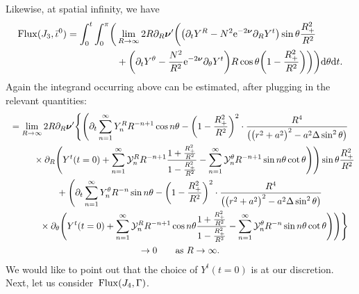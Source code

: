 \documentclass[11pt]{article}
\numberwithin{equation}{section}
\def\ptl{\partial}%
\def\mbo#1{\boldsymbol{#1}}%
\numberwithin{equation}{section}
\begin{document}
Likewise, at spatial infinity, we have
\begin{align*}
{\rm Flux} (J_3, \bar{\iota}^0)= \int^t_0 \int^\pi _0 \biggl(&\lim_{R \to \infty} 2 R \ptl_R \mbo{\nu}' \biggl(\bigl(\ptl_t Y^R - N^2 {\rm e}^{-2 \mbo{\nu}} \ptl_R Y^t\bigr) \sin \theta \frac{R^2_+}{R^2} \notag\\
&{} + \biggl(\ptl_t Y^\theta - \frac{N^2}{R^2} {\rm e}^{-2 \mbo{\nu}} \ptl_\theta Y^t\biggr) R \cos \theta \biggl(1-\frac{R^2_+}{R^2}\biggr) \biggr) \biggr) {\rm d}\theta {\rm d}t.
\end{align*}
Again the integrand occurring above can be estimated, after plugging in the relevant quantities:
\begin{gather*}
= \lim_{R \to \infty} 2R \ptl_R \mbo{\nu}' \Bigg\{ \Biggl(\ptl_t \sum^\infty_{n=1} Y^R_n R^{-n+1} \cos n \theta - \biggl(1 - \frac{R^2_+}{R^2} \biggr)^2 \cdot \frac{R^4}{ \bigl( \bigl(r^2+a^2\bigr)^2 -a^2 \Delta \sin^2 \theta\bigr)} \\
 \qquad\quad{} \times \ptl_R \Biggl(Y^t(t=0) + \sum^\infty_{n =1} \mathcal{Y}^R_n R^{-n+1} \frac{1+ \frac{R^2_+}{R^2}}{1-\frac{R^2_+}{R^2}} - \sum^\infty_{n=1} \mathcal{Y}^\theta_n R^{-n+1} \sin n \theta \cot \theta \Biggr) \Biggr)\sin \theta \frac{R^2_+}{R^2} \notag\\
 \qquad{} + \Biggl( \ptl_t \sum^{\infty}_{n=1} Y^\theta_n R^{-n} \sin n \theta - \biggl(1- \frac{R^2_+}{R^2}\biggr)^2 \cdot \frac{R^4}{ \bigl(\bigl(r^2+a^2\bigr)^2 -a^2 \Delta
	\sin^2 \theta \bigr)} \notag\\
 \qquad\quad{} \times \ptl_\theta \Biggl(Y^t (t=0) + \sum^\infty_{n=1} \mathcal{Y}^R_n R^{-n+1} \cos n \theta \frac{1 + \frac{R^2_+}{R^2}} {{1-\frac{R^2_+}{R^2}} } - \sum^\infty_{n=1} \mathcal{Y}^\theta_n R^{-n} \sin n \theta \cot \theta \Biggr) \Biggr) \Bigg\} \notag\\
 \to 0 \qquad \text{as} \ R \to \infty.
\end{gather*}
We would like to point out that the choice of $Y^t(t=0)$ is at our discretion.
Next, let us consider~${\rm Flux} (J_4, \Gamma)$.
\end{document}
